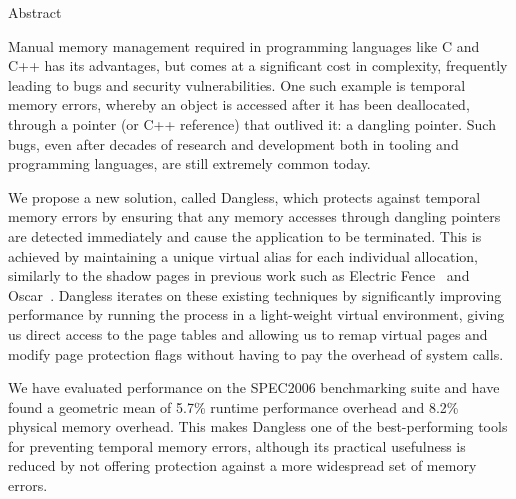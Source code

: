 Abstract

Manual memory management required in programming languages like C and C++ has its advantages, but comes at a significant cost in complexity, frequently leading to bugs and security vulnerabilities. One such example is temporal memory errors, whereby an object is accessed after it has been deallocated, through a pointer (or C++ reference) that outlived it: a dangling pointer. Such bugs, even after decades of research and development both in tooling and programming languages, are still extremely common today.

We propose a new solution, called Dangless, which protects against temporal memory errors by ensuring that any memory accesses through dangling pointers are detected immediately and cause the application to be terminated. This is achieved by maintaining a unique virtual alias for each individual allocation, similarly to the shadow pages in previous work such as Electric Fence~\cite{electric-fence} and Oscar~\cite{oscar2017}. Dangless iterates on these existing techniques by significantly improving performance by running the process in a light-weight virtual environment, giving us direct access to the page tables and allowing us to remap virtual pages and modify page protection flags without having to pay the overhead of system calls.

We have evaluated performance on the SPEC2006 benchmarking suite and have found a geometric mean of 5.7\% runtime performance overhead and 8.2\% physical memory overhead. This makes Dangless one of the best-performing tools for preventing temporal memory errors, although its practical usefulness is reduced by not offering protection against a more widespread set of memory errors.
